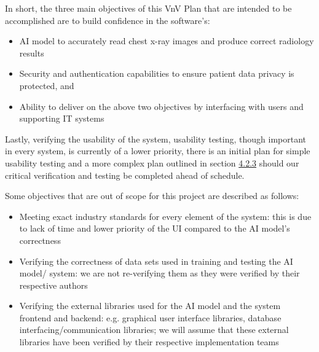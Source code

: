 \documentclass[12pt, titlepage]{article}
\begin{document}
\noindent In short, the three main objectives of this VnV Plan that are intended to be accomplished are to build confidence in the software's:
\begin{itemize}
    \item AI model to accurately read chest x-ray images and produce correct radiology results
    \item Security and authentication capabilities to ensure patient data privacy is protected, and
    \item Ability to deliver on the above two objectives by interfacing with users and supporting IT systems
\end{itemize}

\noindent Lastly, verifying the usability of the system, usability testing, though important in every system, is currently of a lower priority, there is an initial plan for simple usability testing and a more complex plan outlined in section \hyperlink{Usability}{4.2.3} should our critical verification and testing be completed ahead of schedule. 

\noindent Some objectives that are out of scope for this project are described as follows:
\begin{itemize}
    \item Meeting exact industry standards for every element of the system: this is due to lack of time and lower priority of the UI compared to the AI model's correctness
    \item Verifying the correctness of data sets used in training and testing the AI model/ system: we are not re-verifying them as they were verified by their respective authors
    \item Verifying the external libraries used for the AI model and the system frontend and backend: e.g. graphical user interface libraries, database interfacing/communication libraries; we will assume that these external libraries have been verified by their respective implementation teams
\end{itemize}
\end{document}

